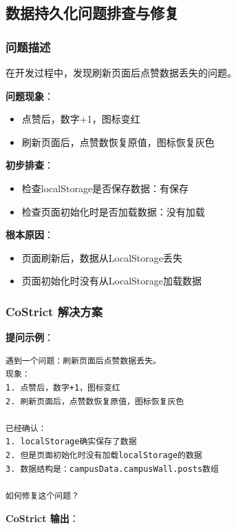 \documentclass[12pt,a4paper]{article}
\begin{document}
\subsection{数据持久化问题排查与修复}

\subsubsection{问题描述}

在开发过程中，发现刷新页面后点赞数据丢失的问题。

\textbf{问题现象}：
\begin{itemize}
    \item 点赞后，数字+1，图标变红
    \item 刷新页面后，点赞数恢复原值，图标恢复灰色
\end{itemize}

\textbf{初步排查}：
\begin{itemize}
    \item 检查localStorage是否保存数据：有保存
    \item 检查页面初始化时是否加载数据：没有加载
\end{itemize}

\textbf{根本原因}：
\begin{itemize}
    \item 页面刷新后，数据从LocalStorage丢失
    \item 页面初始化时没有从LocalStorage加载数据
\end{itemize}

\subsubsection{CoStrict 解决方案}

\textbf{提问示例}：
\begin{verbatim}
遇到一个问题：刷新页面后点赞数据丢失。
现象：
1. 点赞后，数字+1，图标变红
2. 刷新页面后，点赞数恢复原值，图标恢复灰色

已经确认：
1. localStorage确实保存了数据
2. 但是页面初始化时没有加载localStorage的数据
3. 数据结构是：campusData.campusWall.posts数组

如何修复这个问题？
\end{verbatim}

\textbf{CoStrict 输出}：
\end{document}
